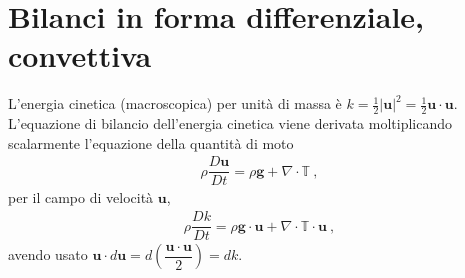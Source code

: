 \documentclass[letterpaper,10pt,english]{jupyterBook}
\begin{document}
\section{Bilanci in forma differenziale, convettiva}
\label{\detokenize{ch/continuum/derived-balances:bilanci-in-forma-differenziale-convettiva}}
\sphinxAtStartPar
{} L’energia cinetica (macroscopica) per unità di massa è \(k = \frac{1}{2}|\mathbf{u}|^2 = \frac{1}{2} \mathbf{u} \cdot \mathbf{u}\). L’equazione di bilancio dell’energia cinetica viene derivata moltiplicando scalarmente l’equazione della quantità di moto
\begin{equation*}
\begin{split}\rho \dfrac{D \mathbf{u}}{Dt} = \rho \mathbf{g} + \nabla \cdot \mathbb{T} \ ,\end{split}
\end{equation*}
\sphinxAtStartPar
per il campo di velocità \(\mathbf{u}\),
\begin{equation*}
\begin{split}\rho \dfrac{D k}{Dt} = \rho \mathbf{g} \cdot \mathbf{u} + \nabla \cdot \mathbb{T} \cdot \mathbf{u} \ ,\end{split}
\end{equation*}
\sphinxAtStartPar
avendo usato \(\mathbf{u} \cdot d \mathbf{u} = d \left( \dfrac{\mathbf{u} \cdot \mathbf{u}}{2} \right) = dk\).
\end{document}
